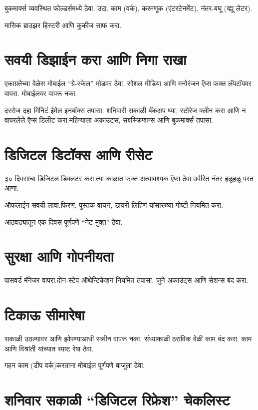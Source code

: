 बुकमार्क्स व्यवस्थित फोल्डर्समध्ये ठेवा. उदा. काम (वर्क), करमणूक (एंटरटेनमेंट), नंतर-बघू (व्ह्यू लेटर).

मासिक ब्राउझर हिस्टरी आणि कुकीज साफ करा.



\section*{सवयी डिझाईन करा आणि निगा राखा}

एकाग्रतेच्या वेळेस मोबाईल “ग्रे-स्केल” मोडवर ठेवा. सोशल मीडिया आणि मनोरंजन ऍप्स फक्त लॅपटॉपवर वापरा.
मोबाईलवर वापरू नका.

दररोज दहा मिनिटं ईमेल इनबॉक्स तपासा. शनिवारी सकाळी बॅकअप घ्या, स्टोरेज क्लीन करा आणि न वापरलेले ऍप्स डिलीट करा.महिन्याला अकाउंट्स, सबस्क्रिप्शन्स आणि बुकमार्क्स तपासा.


\section*{डिजिटल डिटॉक्स आणि रीसेट}

३० दिवसांचा डिजिटल डिक्लटर  करा.त्या काळात फक्त अत्यावश्यक ऍप्स ठेवा.उर्वरित नंतर हळूहळू परत आणा.

ऑफलाईन सवयी लावा.फिरणं, पुस्तक वाचन, डायरी लिहिणं यांसारख्या गोष्टी नियमित करा.

आठवड्यातून एक दिवस पूर्णपणे “नेट-मुक्त” ठेवा.



\section*{सुरक्षा आणि गोपनीयता}

पासवर्ड मॅनेजर वापरा.दोन-स्टेप ऑथेन्टिकेशन नियमित तपासा. जुने अकाउंट्स आणि सेशन्स बंद करा.



\section*{टिकाऊ सीमारेषा}

सकाळी उठल्यावर आणि झोपण्याआधी स्क्रीन वापरू नका. संध्याकाळी ठराविक वेळी काम बंद करा. काम आणि विश्रांती यांच्यात स्पष्ट रेषा ठेवा.

गहन काम (डीप वर्क)करताना मोबाईल पूर्णपणे बाजूला ठेवा.



\section*{शनिवार सकाळी “डिजिटल रिफ्रेश” चेकलिस्ट}

